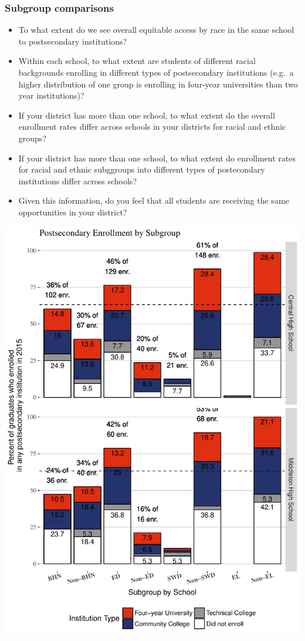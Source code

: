 \documentclass[11pt,]{article}
\providecommand{\tightlist}{%
  \setlength{\itemsep}{0pt}\setlength{\parskip}{0pt}}
\begin{document}
\subsubsection{Subgroup comparisons}\label{subgroup-comparisons}

\begin{itemize}
\tightlist
\item
  To what extent do we see overall equitable access by race in the same
  school to postsecondary institutions?
\item
  Within each school, to what extent are students of different racial
  backgrounds enrolling in different types of postsecondary institutions
  (e.g.~a higher distribution of one group is enrolling in four-year
  universities than two year institutions)?
\item
  If your district has more than one school, to what extent do the
  overall enrollment rates differ across schools in your districts for
  racial and ethnic groups?
\item
  If your district has more than one school, to what extent do
  enrollment rates for racial and ethnic subggroups into different types
  of postecondary institutions differ across schools?
\item
  Given this information, do you feel that all students are receiving
  the same opportunities in your district?
\end{itemize}

\begin{center}\includegraphics{20170511_PSWRR_files/figure-latex/subgroup_enrollment-1} \end{center}
\end{document}
